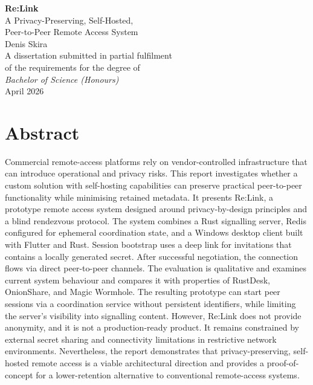 \documentclass[12pt,a4paper,oneside]{report}
\begin{document}
\begin{titlepage}
  \centering
  \vspace*{2cm}
  {\LARGE\bfseries Re:Link}\\[0.6cm]
  {\Large A Privacy-Preserving, Self-Hosted,\\Peer-to-Peer Remote Access System}\\[2cm]
  {\large Denis Skira}\\[1.5cm]
  {\large A dissertation submitted in partial fulfilment\\of the requirements for the degree of}\\[0.4cm]
  {\large\itshape Bachelor of Science (Honours)}\\[2cm]
  {\large April 2026}
  \vfill
\end{titlepage}

\chapter*{Abstract}

Commercial remote-access platforms rely on vendor-controlled infrastructure that can introduce operational and privacy risks. This report investigates whether a custom solution with self-hosting capabilities can preserve practical peer-to-peer functionality while minimising retained metadata. It presents Re:Link, a prototype remote access system designed around privacy-by-design principles and a blind rendezvous protocol. The system combines a Rust signalling server, Redis configured for ephemeral coordination state, and a Windows desktop client built with Flutter and Rust. Session bootstrap uses a deep link for invitations that contains a locally generated secret. After successful negotiation, the connection flows via direct peer-to-peer channels. The evaluation is qualitative and examines current system behaviour and compares it with properties of RustDesk, OnionShare, and Magic Wormhole. The resulting prototype can start peer sessions via a coordination service without persistent identifiers, while limiting the server's visibility into signalling content. However, Re:Link does not provide anonymity, and it is not a production-ready product. It remains constrained by external secret sharing and connectivity limitations in restrictive network environments. Nevertheless, the report demonstrates that privacy-preserving, self-hosted remote access is a viable architectural direction and provides a proof-of-concept for a lower-retention alternative to conventional remote-access systems.
\end{document}
